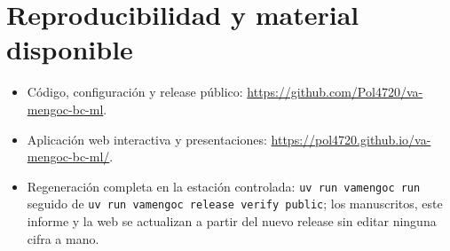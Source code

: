 \documentclass[11pt]{article}
\begin{document}
\section{Reproducibilidad y material disponible}
\begin{itemize}[leftmargin=*]
\item Código, configuración y release público: \url{https://github.com/Pol4720/va-mengoc-bc-ml}.
\item Aplicación web interactiva y presentaciones:
  \url{https://pol4720.github.io/va-mengoc-bc-ml/}.
\item Regeneración completa en la estación controlada: \texttt{uv run vamengoc run} seguido de
  \texttt{uv run vamengoc release verify public}; los manuscritos, este informe y la web se
  actualizan a partir del nuevo release sin editar ninguna cifra a mano.
\end{itemize}



\end{document}
